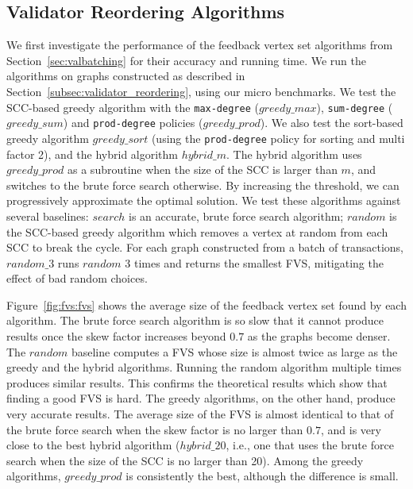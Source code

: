\subsection{Validator Reordering Algorithms}
We first investigate the performance of the feedback vertex set algorithms from Section~\ref{sec:valbatching} 
for their accuracy and running time. We run the algorithms on graphs constructed as described in Section~\ref{subsec:validator_reordering}, using our micro benchmarks. 
We test the SCC-based greedy algorithm with the \texttt{max-degree} ($greedy\_max$), \texttt{sum-degree} ($greedy\_sum$) and \texttt{prod-degree} policies ($greedy\_prod$). We also test the sort-based greedy algorithm $greedy\_sort$ (using the \texttt{prod-degree} policy for sorting and multi factor 2), and the hybrid algorithm $hybrid\_m$. The hybrid algorithm uses $greedy\_prod$ as a subroutine when the size of the SCC is larger than $m$, and switches to the brute force search otherwise. By increasing the threshold, we can progressively approximate the optimal solution. 
We test these algorithms against several baselines: $search$ is an accurate,
brute force search algorithm; $random$ is the SCC-based greedy algorithm which
removes a vertex at random from each SCC to break the cycle. For each graph constructed from a batch of transactions,
$random\_3$ runs $random$ 3 times and returns the smallest FVS, mitigating the
effect of bad random choices.

Figure~\ref{fig:fvs:fvs} shows the average size of the feedback vertex set found by each algorithm. The brute force search algorithm is so slow that it cannot produce results once the skew factor increases beyond $0.7$ as the graphs become denser.
The $random$ baseline computes a FVS whose size is almost twice as large as the greedy and the hybrid algorithms. Running the random algorithm multiple times produces similar results. This confirms the theoretical results which show that finding a good FVS is hard. The greedy algorithms, on the other hand, produce very accurate results. The average size of the FVS is almost identical to that of the brute force search when the skew factor is no larger than $0.7$, and is very close to the best hybrid algorithm ($hybrid\_20$, i.e., one that uses the brute force search when the size of the SCC is no larger than 20). Among the greedy algorithms, $greedy\_prod$ is consistently the best, although the difference is small.

